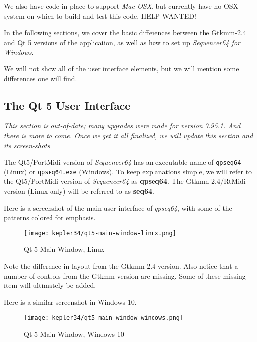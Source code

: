    We also have code in place to support
   \textsl{Mac OSX},
   but currently have no OSX system on which to build and test this
   code.  HELP WANTED!

   In the following sections, we cover the basic differences between the
   Gtkmm-2.4 and Qt 5 versions of the application, as well as how to set up
   \textsl{Sequencer64 for Windows}.

   We will not show all of the user interface elements, but we will mention
   some differences one will find.

\subsection{The Qt 5 User Interface}
\label{subsec:qt_portmidi_qt5_user_interface}

   \textsl{This section is out-of-date; many upgrades were made for version
   0.95.1.  And there is more to come.  Once we get it all finalized, we will
   update this section and its screen-shots.}

   The Qt5/PortMidi version of \textsl{Sequencer64} has an executable name of
   \texttt{qpseq64} (Linux) or \texttt{qpseq64.exe} (Windows).
   To keep explanations simple, we will refer to the Qt5/PortMidi version of
   \textsl{Sequencer64} as \textbf{qpseq64}.
   The Gtkmm-2.4/RtMidi version (Linux only) will be referred to as
   \textbf{seq64}.

   Here is a screenshot of the main user interface of \textsl{qpseq64}, with
   some of the patterns colored for emphasis.

\begin{figure}[H]
   \centering 
   \texttt{[image: kepler34/qt5-main-window-linux.png]}
   \caption{Qt 5 Main Window, Linux}
   \label{fig:qt5_main_window_linux}
\end{figure}

   Note the difference in layout from the Gtkmm-2.4 version.
   Also notice that a number of controls from the Gtkmm version are missing.
   Some of these missing item will ultimately be added.

   Here is a similar screenshot in Windows 10.

\begin{figure}[H]
   \centering 
   \texttt{[image: kepler34/qt5-main-window-windows.png]}
   \caption{Qt 5 Main Window, Windows 10}
   \label{fig:qt5_main_window_windows}
\end{figure}


